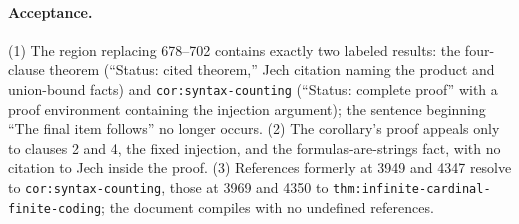 \paragraph{Acceptance.}
(1) The region replacing 678--702 contains exactly two labeled results: the four-clause theorem (``Status: cited theorem,'' Jech citation naming the product and union-bound facts) and \texttt{cor:syntax-counting} (``Status: complete proof'' with a proof environment containing the injection argument); the sentence beginning ``The final item follows'' no longer occurs.
(2) The corollary's proof appeals only to clauses 2 and 4, the fixed injection, and the formulas-are-strings fact, with no citation to Jech inside the proof.
(3) References formerly at 3949 and 4347 resolve to \texttt{cor:syntax-counting}, those at 3969 and 4350 to \texttt{thm:infinite-cardinal-finite-coding}; the document compiles with no undefined references.
